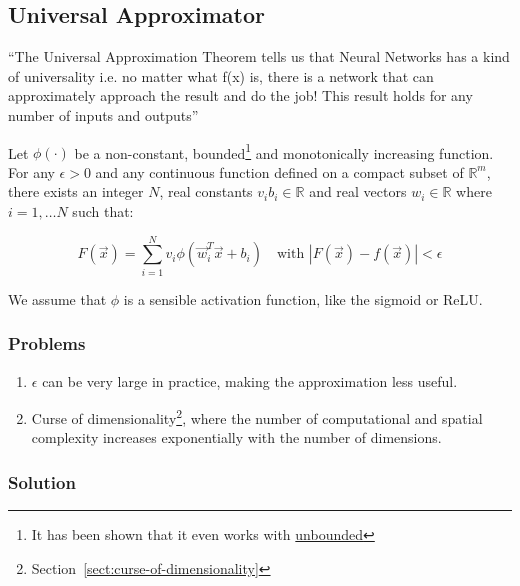 \documentclass[11pt]{article}
\begin{document}
\subsection{Universal Approximator}

``The Universal Approximation Theorem tells us that Neural Networks has a kind of universality i.e. no matter what f(x) is, there is a network that can approximately approach the result and do the job! This result holds for any number of inputs and outputs''~\cite{towardsdatascienceNeuralNetworks}

\begin{theorem}\label{theorem:universal-approximator}
    Let $\phi(\cdot)$ be a non-constant, bounded\footnote{It has been shown that it even works with \href{https://edstem.org/us/courses/46843/discussion/4124905}{unbounded}} and monotonically increasing function. For any $\epsilon > 0$ and any continuous function defined on a compact subset of $\mathbb{R}^m$, there exists an integer $N$, real constants $v_i b_i \in \mathbb{R}$ and real vectors $w_i \in \mathbb{R}$ where $i=1, \ldots N$ such that:

    \begin{equation}
        F(\vec{x})=\sum^N_{i=1}v_i\phi(\vec{w}_i^T\vec{x}+b_i) \quad \text{with } |F(\vec{x}) - f(\vec{x})| < \epsilon
    \end{equation}

    We assume that $\phi$ is a sensible activation function, like the sigmoid or ReLU.
\end{theorem}

\subsubsection{Problems}

\begin{enumerate}
    \item $\epsilon$ can be very large in practice, making the approximation less useful.
    \item Curse of dimensionality\footnote{Section~\ref{sect:curse-of-dimensionality}}, where the number of computational and spatial complexity increases exponentially with the number of dimensions.
\end{enumerate}

\subsubsection{Solution}
\end{document}
